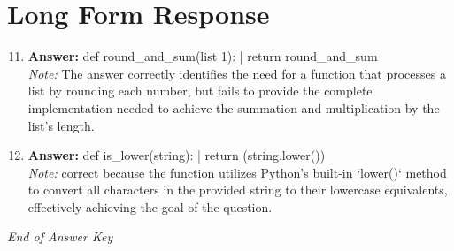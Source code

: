 \documentclass[12pt]{article}
\begin{document}
\section*{Long Form Response}
\begin{enumerate}[label=\arabic*.]
\setcounter{enumi}{10}
\item \textbf{Answer:} def round\_and\_sum(list 1): | return round\_and\_sum
\\ \textit{Note:} The answer correctly identifies the need for a function that processes a list by rounding each number, but fails to provide the complete implementation needed to achieve the summation and multiplication by the list's length.
\item \textbf{Answer:} def is\_lower(string): | return (string.lower())
\\ \textit{Note:} correct because the function utilizes Python's built-in `lower()` method to convert all characters in the provided string to their lowercase equivalents, effectively achieving the goal of the question.
\end{enumerate}

\vfill
\noindent\textit{End of Answer Key}
\end{document}
